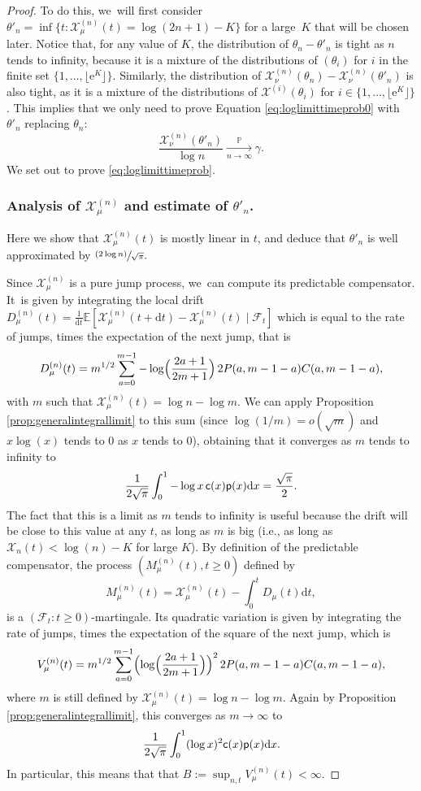 \documentclass[11pt]{article}
\newcommand{\psfrac}[2]{\sfrac{(#1)}{#2}}
\newcommand{\Xmun}{\mathcal{X}^{(n)}_{\mu}}
\newcommand{\Xnun}{\mathcal{X}^{(n)}_{\nu}}
\let\dH\gamma
\newcommand{\pp}{\mathsf{p}}
\newcommand{\pr}{\mathbb{P}}
\newcommand{\dd}{\mathrm{d}}
\theoremstyle{definition}
\begin{document}
\begin{proof}
To do this, we~will first consider $\theta'_n=\inf\{t: \Xmun(t) = \log (2n+1)-K\}$ for a large~$K$ that will be chosen later. Notice that, for any value of $K$, the distribution of $\theta_n-\theta'_n$ is tight as $n$ tends to infinity, because it is a mixture of the distributions of $(\theta_i)$ for $i$ in the finite set $\{1,\ldots,\lfloor \mathrm{e}^{K}\rfloor\}$. Similarly, the distribution of $\Xnun(\theta_n)-\Xnun(\theta'_n)$ is also tight, as it is a mixture of the distributions of $\mathcal{X}^{(i)}(\theta_i)$ for $i\in \{1,\ldots,\lfloor \mathrm{e}^{K}\rfloor\}$. This implies that we only need to prove Equation \eqref{eq:loglimittimeprob0} with $\theta'_n$ replacing $\theta_n$:\vspace*{-3pt}
\begin{equation}\label{eq:loglimittimeprob}
\frac{ \Xnun(\theta'_n)}{\log n} \xrightarrow[\textstyle n\to\infty]{\textstyle\pr} \dH.
\end{equation}
We set out to prove \eqref{eq:loglimittimeprob}.

\subsubsection*{Analysis of $\Xmun$ and estimate of $\theta'_n$.} Here we show that $\Xmun(t)$ is mostly linear in $t$, and deduce that $\theta'_n$ is well approximated by $\psfrac{2\log n}{\sqrt{\pi}}.
$

Since $\mathcal{X}^{(n)}_{\mu}$ is a pure jump process, we~can compute its predictable compensator. It~is given by integrating the local drift $D_\mu^{(n)}(t)=\frac{1}{ \mathrm{d}t} \mathbb{E}[\mathcal{X}^{(n)}_{\mu}(t+\dd t)-\mathcal{X}^{(n)}_{\mu}(t)\mid \mathcal{F}_t]$ which is equal to the rate of jumps, times the expectation of the next jump, that is
\[
D_{\mu}^{(n)}(t)=m^{1/2}\sum_{a=0}^{m-1} -\log\Bigl(\frac{2a+1}{2m+1}\Bigr)\, 2P(a,m-1-a)C(a,m-1-a),
\]
with $m$ such that $\mathcal{X}^{(n)}_{\mu}(t)=\log n - \log m$.
We can apply Proposition \ref{prop:generalintegrallimit} to this sum (since $\log (1/m)=o(\sqrt{m})$ and $x\log(x)$ tends to $0$ as $x$ tends to $0$), obtaining that it converges as $m$ tends to infinity to
\[
\frac1{2\sqrt{\pi}}\int_0^1 -\log x \, \ff(x) \pp(x)\dd x=\frac{\sqrt{\pi}}{2}.
\]
The fact that this is a limit as $m$ tends to infinity is useful because the drift will be close to this value at any $t$, as long as $m$ is big (i.e., as long as $\mathcal{X}_n(t)< \log(n)-K$ for large $K$). By definition of the predictable compensator, the process $(M^{(n)}_{\mu}(t),t\geq 0)$ defined by
\[
M^{(n)}_{\mu}(t)=\Xmun(t)-\int_0^t D_{\mu}(t)\mathrm dt,
\]
is a $(\mathcal{F}_t : t \geq 0)$-martingale. Its quadratic variation is given by integrating the rate of jumps, times the expectation of the square of the next jump, which is
\[
V_{\mu}^{(n)}(t)=m^{1/2}\sum_{a=0}^{m-1} \Bigl(\log\Bigl(\frac{2a+1}{2m+1}\Bigr)\Bigr)^2\, 2P(a,m-1-a)C(a,m-1-a),
\]
where $m$ is still defined by $\mathcal{X}^{(n)}_{\mu}(t)=\log n - \log m$. Again by Proposition \ref{prop:generalintegrallimit}, this converges as $m \to \infty$ to
\[
\frac1{2\sqrt{\pi}}\int_0^1 (\log x)^2\ff(x)\pp(x)\dd x.
\]
In particular, this means that that $B:=\sup_{n,t} V^{(n)}_{\mu}(t)<\infty$.


\end{proof}
\end{document}

